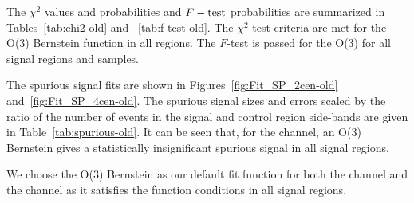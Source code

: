 

The $\chi^2$ values and probabilities  
and $F-\rm{test}$ probabilities are summarized in Tables~\ref{tab:chi2-old} and ~\ref{tab:f-test-old}. The $\chi^2$ test criteria are met for the O(3) Bernstein function in all regions. The $F$-test is passed for the O(3) for all signal regions and samples.  
  
The spurious signal fits are shown in Figures~\ref{fig:Fit_SP_2cen-old} and~\ref{fig:Fit_SP_4cen-old}.   The spurious signal sizes and errors scaled by the ratio of the number of events in the signal and control region side-bands are given in Table~\ref{tab:spurious-old}.  It can be seen that, for the \twocentral channel, an O(3) Bernstein gives a statistically insignificant spurious signal in all signal regions.   

We choose the O(3) Bernstein as our default fit function for both the \twocentral channel and the \fourcentral channel as it satisfies the function conditions in all signal regions.


